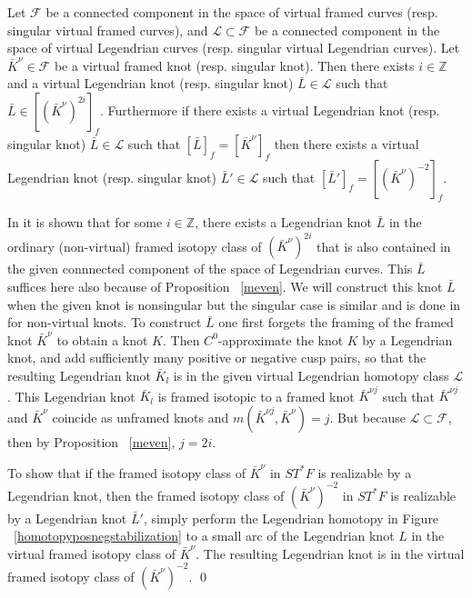 \begin{prop}  \label{prop2i}
Let $\mathcal{F}$ be a connected component in the space of virtual framed curves (resp. singular virtual framed curves), and $\mathcal{L}\subset\mathcal{F}$ be a connected component in the space of virtual Legendrian curves (resp. singular virtual Legendrian curves).  Let $\bar{K}^\nu\in\mathcal{F}$ be a virtual framed knot (resp. singular knot). Then there exists $i\in\mathbb{Z}$ and a virtual Legendrian knot (resp. singular knot) $\bar{L}\in \mathcal{L}$ such that $\bar{L}\in [(\bar{K}^\nu)^{2i}]_f$.  Furthermore if there exists a virtual Legendrian knot (resp. singular knot) $\bar{L}\in \mathcal{L}$ such that $[\bar{L}]_f = [\bar{K}^\nu]_f$ then there exists a virtual Legendrian knot (resp. singular knot) $\bar{L}'\in\mathcal{L}$ such that $[\bar{L}']_f = [(\bar{K}^\nu)^{-2}]_f$.
\end{prop}

\pp 
In \cite{Chernov} it is shown that for some $i \in \mathbb{Z}$, there exists a Legendrian knot $\bar{L}$ in the ordinary (non-virtual) framed isotopy class of $(\bar{K}^\nu)^{2i}$ that is also contained in the given connnected component of the space of Legendrian curves.  This $\bar{L}$ suffices here also because of Proposition ~\ref{meven}.  We will construct this knot $\bar{L}$ when the given knot is nonsingular but the singular case is similar and is done in \cite{Chernov} for non-virtual knots.  To construct $\bar{L}$ one first forgets the framing of the framed knot $\bar{K}^\nu$ to obtain a knot $K$. Then $C^0$-approximate the knot $K$ by a Legendrian knot, and add sufficiently many positive or negative cusp pairs, so that the resulting Legendrian knot $\bar{K}_l$ is in the given virtual Legendrian homotopy class $\mathcal{L}$.  This Legendrian knot $\bar{K}_l$ is framed isotopic to a framed knot $\bar{K}^{\nu j}$ such that $\bar{K}^{\nu j}$ and $\bar{K}^{\nu}$ coincide as unframed knots and $m(\bar{K}^{\nu j}, \bar{K}^{\nu})=j$.  But because $\mathcal{L}\subset \mathcal{F}$, then by Proposition ~\ref{meven}, $j=2i$.  

To show that if the framed isotopy class of $\bar{K}^\nu$ in $ST^*F$ is realizable by a Legendrian knot, then the framed isotopy class of $(\bar{K}^\nu)^{-2}$ in $ST^*F$ is realizable by a Legendrian knot $\bar{L}'$, simply perform the Legendrian homotopy in Figure ~\ref{homotopyposnegstabilization} to a small arc of the Legendrian knot $L$ in the virtual framed isotopy class of $\bar{K}^\nu$.  The resulting Legendrian knot is in the virtual framed isotopy class of $(\bar{K}^\nu)^{-2}$.
\qed


